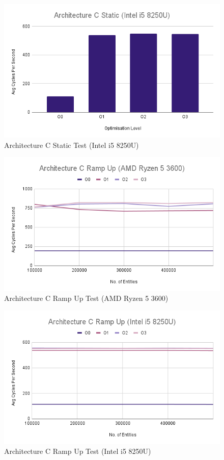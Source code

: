 \documentclass{article}
\begin{document}
\begin{figure}[!h]
\centering
\includegraphics[scale=0.5]{Architecture C Static (Intel i5 8250U).png}
\caption{Architecture C Static Test (Intel i5 8250U)}
\label{arch_c_static_laptop}
\end{figure}

\begin{figure}[!h]
\centering
\includegraphics[scale=0.5]{Architecture C Ramp Up (AMD Ryzen 5 3600).png}
\caption{Architecture C Ramp Up Test (AMD Ryzen 5 3600)}
\label{arch_c_ramp_up_pc}
\end{figure}

\begin{figure}[!h]
\centering
\includegraphics[scale=0.5]{Architecture C Ramp Up (Intel i5 8250U).png}
\caption{Architecture C Ramp Up Test (Intel i5 8250U)}
\label{arch_c_ramp_up_laptop}
\end{figure}
\end{document}
